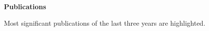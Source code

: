 \documentclass[10pt]{article}
\makeatletter
\newcommand{\Strasse}{Burg 4}
\newcommand{\Ort}{Braunschweig}
\newcommand{\Plz}{38124}
\newcommand{\Telefon}{+49~5341~4022052}
\newcommand{\Email}{stephan.sigg@udo.edu}
\newcommand{\Country}{Germany}
\makeatother
\begin{document}
\lhead{ }
\label{ErsteSeite}
\centerline{ \Large \textbf{Publications}}
 \vspace{1cm}
Most significant publications of the last three years are highlighted.
\end{document}
